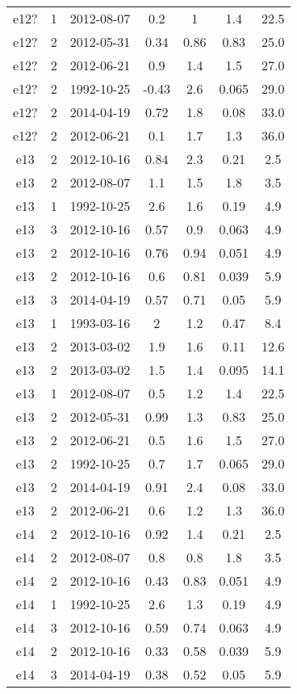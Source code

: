 \begin{table*}[htp]
\begin{tabular}{ccccccc}
e12? & 1 & 2012-08-07 & 0.2 & 1 & 1.4 & 22.5 \\
e12? & 2 & 2012-05-31 & 0.34 & 0.86 & 0.83 & 25.0 \\
e12? & 2 & 2012-06-21 & 0.9 & 1.4 & 1.5 & 27.0 \\
e12? & 2 & 1992-10-25 & -0.43 & 2.6 & 0.065 & 29.0 \\
e12? & 2 & 2014-04-19 & 0.72 & 1.8 & 0.08 & 33.0 \\
e12? & 2 & 2012-06-21 & 0.1 & 1.7 & 1.3 & 36.0 \\
e13 & 2 & 2012-10-16 & 0.84 & 2.3 & 0.21 & 2.5 \\
e13 & 2 & 2012-08-07 & 1.1 & 1.5 & 1.8 & 3.5 \\
e13 & 1 & 1992-10-25 & 2.6 & 1.6 & 0.19 & 4.9 \\
e13 & 3 & 2012-10-16 & 0.57 & 0.9 & 0.063 & 4.9 \\
e13 & 2 & 2012-10-16 & 0.76 & 0.94 & 0.051 & 4.9 \\
e13 & 2 & 2012-10-16 & 0.6 & 0.81 & 0.039 & 5.9 \\
e13 & 3 & 2014-04-19 & 0.57 & 0.71 & 0.05 & 5.9 \\
e13 & 1 & 1993-03-16 & 2 & 1.2 & 0.47 & 8.4 \\
e13 & 2 & 2013-03-02 & 1.9 & 1.6 & 0.11 & 12.6 \\
e13 & 2 & 2013-03-02 & 1.5 & 1.4 & 0.095 & 14.1 \\
e13 & 1 & 2012-08-07 & 0.5 & 1.2 & 1.4 & 22.5 \\
e13 & 2 & 2012-05-31 & 0.99 & 1.3 & 0.83 & 25.0 \\
e13 & 2 & 2012-06-21 & 0.5 & 1.6 & 1.5 & 27.0 \\
e13 & 2 & 1992-10-25 & 0.7 & 1.7 & 0.065 & 29.0 \\
e13 & 2 & 2014-04-19 & 0.91 & 2.4 & 0.08 & 33.0 \\
e13 & 2 & 2012-06-21 & 0.6 & 1.2 & 1.3 & 36.0 \\
e14 & 2 & 2012-10-16 & 0.92 & 1.4 & 0.21 & 2.5 \\
e14 & 2 & 2012-08-07 & 0.8 & 0.8 & 1.8 & 3.5 \\
e14 & 2 & 2012-10-16 & 0.43 & 0.83 & 0.051 & 4.9 \\
e14 & 1 & 1992-10-25 & 2.6 & 1.3 & 0.19 & 4.9 \\
e14 & 3 & 2012-10-16 & 0.59 & 0.74 & 0.063 & 4.9 \\
e14 & 2 & 2012-10-16 & 0.33 & 0.58 & 0.039 & 5.9 \\
e14 & 3 & 2014-04-19 & 0.38 & 0.52 & 0.05 & 5.9 \\

\end{tabular}
\end{table*}
